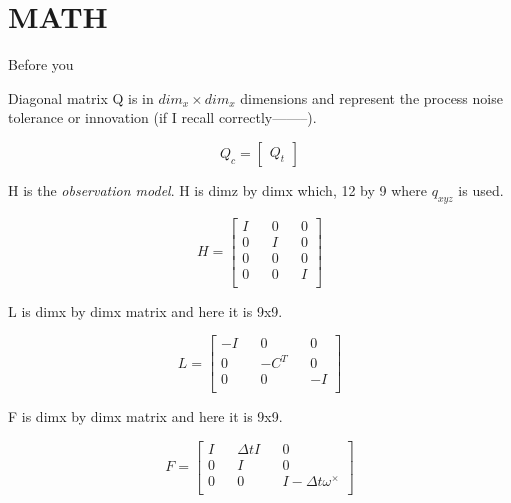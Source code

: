 \documentclass[letterpaper, 10 pt, conference]{ieeeconf}  %
\newcommand{\transpose}[1]{\ensuremath{#1^{\scriptscriptstyle T}}}
\begin{document}
\section{MATH}

Before you


Diagonal matrix Q is in $dim_x \times dim_x$ dimensions and represent the process
noise tolerance or innovation (if I recall correctly--------).

\begin{equation}
Q_{c} =
        \begin{bmatrix}
                Q_{t}
        \end{bmatrix}
\end{equation}

H is the \textit{observation model}.
H is dimz by dimx which, 12 by 9 where $q_{xyz}$ is used.

\begin{equation}
H =
\begin{bmatrix}
        I && 0 && 0  \\
        0 && I && 0  \\
        0 && 0 && 0  \\
        0 && 0 && I  \\
\end{bmatrix}
\end{equation}

L is dimx by dimx matrix and here it is 9x9.

\begin{equation}
L =
\begin{bmatrix}
        -I && 0 && 0  \\
        0 && -\transpose{C} && 0  \\
        0 && 0 && -I  \\
\end{bmatrix}
\end{equation}


F is dimx by dimx matrix and here it is 9x9.

\begin{equation}
F =
\begin{bmatrix}
        I && \Delta t   I && 0  \\
        0 && I && 0  \\
        0 && 0 && I- \Delta t \omega^{\times}  \\
\end{bmatrix}
\end{equation}
\end{document}
